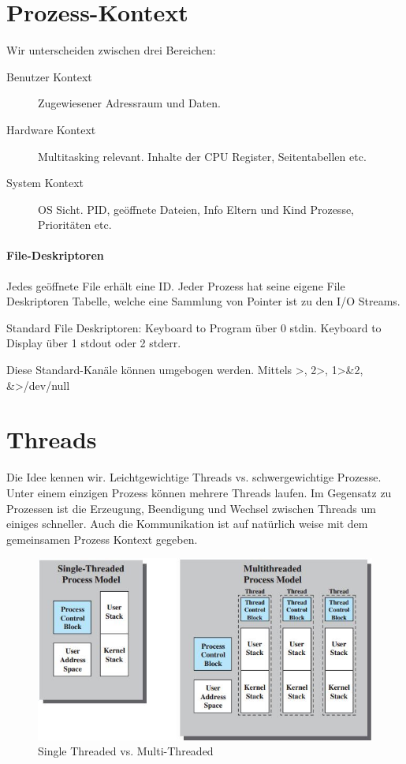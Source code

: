 \section{Prozess-Kontext}
Wir unterscheiden zwischen drei Bereichen:
\begin{description}
	\item[Benutzer Kontext] Zugewiesener Adressraum und Daten.
	\item[Hardware Kontext] Multitasking relevant. Inhalte der CPU Register, Seitentabellen etc.
	\item[System Kontext] OS Sicht. PID, geöffnete Dateien, Info Eltern und Kind Prozesse, Prioritäten etc. 
\end{description}

\paragraph{File-Deskriptoren}
Jedes geöffnete File erhält eine ID. Jeder Prozess hat seine eigene File Deskriptoren Tabelle, welche eine Sammlung von Pointer ist zu den I/O Streams.

Standard File Deskriptoren: Keyboard to Program über 0 stdin. Keyboard to Display über 1 stdout oder 2 stderr.

Diese Standard-Kanäle können umgebogen werden. Mittels >, 2>, 1>\&2, \&>/dev/null

\section{Threads}
Die Idee kennen wir. Leichtgewichtige Threads vs. schwergewichtige Prozesse. Unter einem einzigen Prozess können mehrere Threads laufen. Im Gegensatz zu Prozessen ist die Erzeugung, Beendigung und Wechsel zwischen Threads um einiges schneller. Auch die Kommunikation ist auf natürlich weise mit dem gemeinsamen Prozess Kontext gegeben.

\begin{figure}[h!]
\centering
\includegraphics[width=0.7\linewidth]{fig/system-software-single-threaded-vs-muli-threaded}
\caption{Single Threaded vs. Multi-Threaded}
\label{fig:system-software-single-threaded-vs-muli-threaded}
\end{figure}

